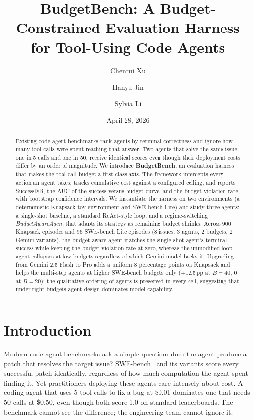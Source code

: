 \documentclass[11pt]{article}
\title{\textbf{BudgetBench: A Budget-Constrained Evaluation Harness for Tool-Using Code Agents}}
\author[1]{Chenrui Xu}
\author[1]{Hanyu Jin}
\author[1]{Sylvia Li}
\affil[1]{Carnegie Mellon University \\ \texttt{\{chenrui2, hanyuj, yangli6\}@andrew.cmu.edu}}
\date{April 28, 2026}
\begin{document}
\maketitle

\begin{abstract}
Existing code-agent benchmarks rank agents by terminal correctness and ignore
how many tool calls were spent reaching that answer. Two agents that solve
the same issue, one in 5 calls and one in 50, receive identical scores even
though their deployment costs differ by an order of magnitude. We introduce
\textbf{BudgetBench}, an evaluation harness that makes the tool-call budget
a first-class axis. The framework intercepts every action an agent takes,
tracks cumulative cost against a configured ceiling, and reports
Success@B, the AUC of the success-versus-budget curve, and the budget
violation rate, with bootstrap confidence intervals. We instantiate the
harness on two environments (a deterministic Knapsack toy environment and
SWE-bench Lite) and study three agents: a single-shot baseline, a standard
ReAct-style loop, and a regime-switching \emph{BudgetAwareAgent} that adapts
its strategy as remaining budget shrinks. Across 900 Knapsack episodes and 96 SWE-bench Lite episodes
(8 issues, 3 agents, 2 budgets, 2 Gemini variants), the
budget-aware agent matches the
single-shot agent's terminal success while keeping the budget violation
rate at zero, whereas the unmodified loop agent collapses at low budgets
regardless of which Gemini model backs it. Upgrading from Gemini 2.5
Flash to Pro adds a uniform 8 percentage points on Knapsack and helps
the multi-step agents at higher SWE-bench budgets only ($+$12.5\,pp at
$B = 40$, $0$ at $B = 20$); the qualitative ordering of agents is
preserved in every cell, suggesting that under tight budgets agent
design dominates model capability.
\end{abstract}

\section{Introduction}
\label{sec:intro}

Modern code-agent benchmarks ask a simple question: does the agent produce
a patch that resolves the target issue? SWE-bench~\cite{jimenez2024swebench} and
its variants score every successful patch identically, regardless of how
much computation the agent spent finding it. Yet practitioners deploying
these agents care intensely about cost. A coding agent that uses 5 tool
calls to fix a bug at \$0.01 dominates one that needs 50 calls at \$0.50,
even though both score 1.0 on standard leaderboards. The benchmark cannot
see the difference; the engineering team cannot ignore it.
\end{document}
